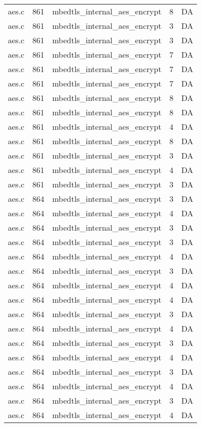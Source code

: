 \begin{table}
\begin{tabular}{clrrr}
aes.c& 861&mbedtls\_internal\_aes\_encrypt&8 &DA\\
aes.c& 861&mbedtls\_internal\_aes\_encrypt&3 &DA\\
aes.c& 861&mbedtls\_internal\_aes\_encrypt&3 &DA\\
aes.c& 861&mbedtls\_internal\_aes\_encrypt&7 &DA\\
aes.c& 861&mbedtls\_internal\_aes\_encrypt&7 &DA\\
aes.c& 861&mbedtls\_internal\_aes\_encrypt&7 &DA\\
aes.c& 861&mbedtls\_internal\_aes\_encrypt&8 &DA\\
aes.c& 861&mbedtls\_internal\_aes\_encrypt&8 &DA\\
aes.c& 861&mbedtls\_internal\_aes\_encrypt&4 &DA\\
aes.c& 861&mbedtls\_internal\_aes\_encrypt&8 &DA\\
aes.c& 861&mbedtls\_internal\_aes\_encrypt&3 &DA\\
aes.c& 861&mbedtls\_internal\_aes\_encrypt&4 &DA\\
aes.c& 861&mbedtls\_internal\_aes\_encrypt&3 &DA\\
aes.c& 864&mbedtls\_internal\_aes\_encrypt&3 &DA\\
aes.c& 864&mbedtls\_internal\_aes\_encrypt&4 &DA\\
aes.c& 864&mbedtls\_internal\_aes\_encrypt&3 &DA\\
aes.c& 864&mbedtls\_internal\_aes\_encrypt&3 &DA\\
aes.c& 864&mbedtls\_internal\_aes\_encrypt&4 &DA\\
aes.c& 864&mbedtls\_internal\_aes\_encrypt&3 &DA\\
aes.c& 864&mbedtls\_internal\_aes\_encrypt&4 &DA\\
aes.c& 864&mbedtls\_internal\_aes\_encrypt&4 &DA\\
aes.c& 864&mbedtls\_internal\_aes\_encrypt&3 &DA\\
aes.c& 864&mbedtls\_internal\_aes\_encrypt&4 &DA\\
aes.c& 864&mbedtls\_internal\_aes\_encrypt&3 &DA\\
aes.c& 864&mbedtls\_internal\_aes\_encrypt&4 &DA\\
aes.c& 864&mbedtls\_internal\_aes\_encrypt&3 &DA\\
aes.c& 864&mbedtls\_internal\_aes\_encrypt&4 &DA\\
aes.c& 864&mbedtls\_internal\_aes\_encrypt&3 &DA\\
aes.c& 864&mbedtls\_internal\_aes\_encrypt&4 &DA\\

\end{tabular}
\end{table}
